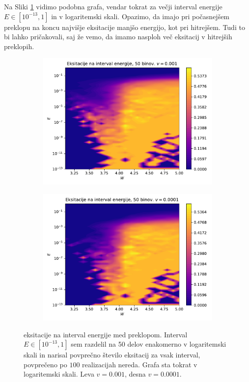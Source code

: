 Na Sliki \ref{fig:EksBini2} vidimo podobna grafa, vendar tokrat za večji interval energije $E \in [10^{-13},1]$ in v logaritemski skali. Opazimo, da imajo pri počasnejšem preklopu na koncu najvišje eksitacije manjšo energijo, kot pri hitrejšem. Tudi to bi lahko pričakovali, saj že vemo, da imamo nasploh več eksitacij v hitrejših preklopih.
\begin{figure}[H]
\centering
\begin{subfigure}{.49\textwidth}
\includegraphics[trim=0 0 0 25,clip,width=\linewidth]{Figures/EksBini3.pdf}
\end{subfigure}
\begin{subfigure}{.49\textwidth}
\includegraphics[trim=0 0 0 25,clip,width=\linewidth]{Figures/EksBini4.pdf}
\end{subfigure}
\caption{eksitacije na interval energije med preklopom. Interval $E \in [10^{-13},1]$ sem razdelil na 50 delov enakomerno v logaritemski skali in narisal povprečno število eksitacij za vsak interval, povprečeno po $100$ realizacijah nereda. Grafa sta tokrat v logaritemski skali. Leva $v=0.001$, desna $v=0.0001$.}
\label{fig:EksBini2}
\end{figure}

